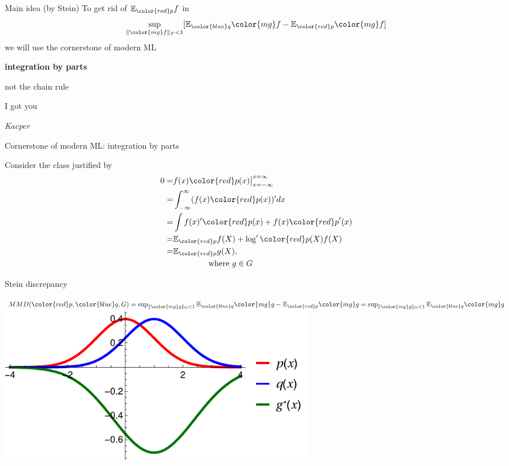 \documentclass{beamer}
\begin{document}
 
 
 \begin{frame}{Main idea (by Stein)}
To get rid of $\ev_{ {\color{red} p} }f$  in $$ \sup_{    \| {\color{mg}f} \|_F<1} [\ev_{{ \color{blue} q}}{\color{mg}f}- \ev_{{\color{red} p}} {\color{mg}f}] $$we will use the cornerstone of modern ML

\pause
\textbf{integration by parts}

\pause 
not the chain rule

\pause
I got you

\pause 
\begin{flushright}
\small \textit{Kacper} 
\end{flushright}



\end{frame} 

  \begin{frame}{Cornerstone of modern ML: integration by parts}
  \begin{center}
  Consider the  class   justified by 
\begin{align*}
 0= &  f(x) {\color{red} p}(x)  \big|_{x=-\infty}^{x=\infty} \\
   = &  \int_{-\infty}^{\infty} (f(x) {\color{red} p}(x) )'  dx \\
   = &  \int   f(x)' { \color{red} p}(x)   + f(x){\color{red} p}'(x)  \\
   = &  \ev_{\color{red} p} f(X)  +  \log' {\color{red} p}(X) f(X) \\
   = & \ev_{\color{red} p} g(X), \\
    & \quad \quad \quad  \quad  \text{ where } g \in G
\end{align*}
\end{center}

 \end{frame} 
  

 \begin{frame}{Stein discrepancy }
 \begin{center}
 
$MMD({\color{red} p},{ \color{blue} q},G) = \sup_{   \| {\color{mg} g} \|_G<1} \ev_{{ \color{blue} q}}{\color{mg}g} - \ev_{{\color{red} p}} {\color{mg}g}  = \sup_{ \| {\color{mg} g} \|_G<1} \ev_{{ \color{blue} q}} {\color{mg}g} $  \\
\vspace{0.5cm}
 \includegraphics[width=0.6\textwidth]{./img/s1.pdf} 
 \end{center}
 \end{frame} 
  
\end{document}
